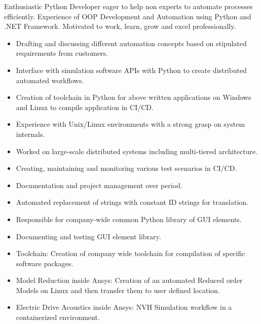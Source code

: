 \documentclass[10pt,a4paper,ragged2e,withhyper]{altacv}
\begin{document}
\begin{paracol}{2}

\begin{flushleft}
Enthusiastic Python Developer eager to help non experts to automate processes efficiently. 
Experience of OOP Development and Automation using Python and .NET Framework. 
Motivated to work, learn, grow and excel professionally.
\end{flushleft}

\begin{itemize}
\item Drafting and discussing different automation concepts based on stipulated requirements from customers.
\item Interface with simulation software APIs with Python to create distributed automated workflows.
\item Creation of toolchain in Python for above written applications on Windows and Linux to compile application in CI/CD.
\item Experience with Unix/Linux environments with a strong grasp on system internals.
\item Worked on large-scale distributed systems including multi-tiered architecture.
\item Creating, maintaining and monitoring various test scenarios in CI/CD.
\item Documentation and project management over period.
\end{itemize}
\divider
{}
\begin{itemize}
\item Automated replacement of strings with constant ID strings for translation. 
\item Responsible for company-wide common Python library of GUI elements.
\item Documenting and testing GUI element library.
\end{itemize}
\divider

\begin{itemize}

\item Toolchain: Creation of company wide toolchain for compilation of specific software packages.
\item Model Reduction inside Ansys: Creation of an automated Reduced order Models on Linux and then transfer them to user defined location.
\item Electric Drive Acoustics inside Ansys: NVH Simulation workflow in a containerized environment.
\end{itemize}


\end{paracol}
\end{document}
